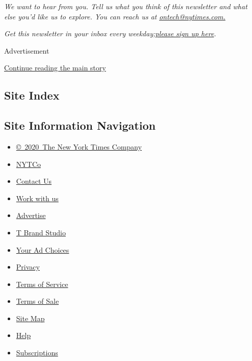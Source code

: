 \emph{We want to hear from you. Tell us what you think of this
newsletter and what else you'd like us to explore. You can reach us at}
\href{mailto:ontech@nytimes.com?subject=On\%20Tech\%20Feedback}{\emph{ontech@nytimes.com.}}

\emph{Get this newsletter in your inbox every
weekday;}\href{https://www.nytimes.com/newsletters/signup/OT}{\emph{please
sign up here}}\emph{.}

Advertisement

\protect\hyperlink{after-bottom}{Continue reading the main story}

\hypertarget{site-index}{%
\subsection{Site Index}\label{site-index}}

\hypertarget{site-information-navigation}{%
\subsection{Site Information
Navigation}\label{site-information-navigation}}

\begin{itemize}
\tightlist
\item
  \href{https://help.nytimes.com/hc/en-us/articles/115014792127-Copyright-notice}{©~2020~The
  New York Times Company}
\end{itemize}

\begin{itemize}
\tightlist
\item
  \href{https://www.nytco.com/}{NYTCo}
\item
  \href{https://help.nytimes.com/hc/en-us/articles/115015385887-Contact-Us}{Contact
  Us}
\item
  \href{https://www.nytco.com/careers/}{Work with us}
\item
  \href{https://nytmediakit.com/}{Advertise}
\item
  \href{http://www.tbrandstudio.com/}{T Brand Studio}
\item
  \href{https://www.nytimes.com/privacy/cookie-policy\#how-do-i-manage-trackers}{Your
  Ad Choices}
\item
  \href{https://www.nytimes.com/privacy}{Privacy}
\item
  \href{https://help.nytimes.com/hc/en-us/articles/115014893428-Terms-of-service}{Terms
  of Service}
\item
  \href{https://help.nytimes.com/hc/en-us/articles/115014893968-Terms-of-sale}{Terms
  of Sale}
\item
  \href{https://spiderbites.nytimes.com}{Site Map}
\item
  \href{https://help.nytimes.com/hc/en-us}{Help}
\item
  \href{https://www.nytimes.com/subscription?campaignId=37WXW}{Subscriptions}
\end{itemize}
